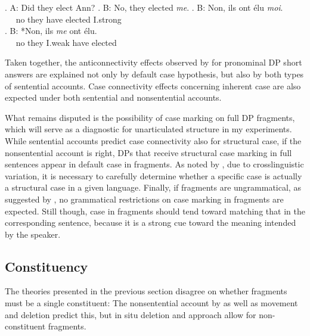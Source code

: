 \ex. A: Did they elect Ann?
\a. B: No, they elected \textit{me}.
\bg.  B: Non, ils ont élu \textit{moi}.\\
~~ no they have elected I.strong\\
\cg. B: *Non, ils \textit{me} ont élu.\\ 
~~ no they I.weak have elected\\

\begin{sloppypar}\noindent
Taken together, the anticonnectivity effects observed by \citet{barton.progovac2005} for pronominal DP short answers are explained not only by  default case hypothesis, but also by both types of sentential accounts. Case connectivity effects concerning inherent case are also expected under both sentential and nonsentential accounts.\end{sloppypar}

What remains disputed is the possibility of case marking on full DP fragments, which will serve as a diagnostic for unarticulated structure in my experiments. While sentential accounts predict case connectivity also for structural case, if the nonsentential account is right, DPs that receive structural case marking in full sentences appear in default case in fragments. As noted by \citet{progovac.etal2006}, due to crosslinguistic variation, it is necessary to carefully determine whether a specific case is actually a structural case in a given language. Finally, if fragments are ungrammatical, as suggested by \citet{bergen.goodman2015}, no grammatical restrictions on case marking in fragments are expected. Still though, case in fragments should tend toward matching that in the corresponding sentence, because it is a strong cue toward the meaning intended by the speaker.

\subsection{Constituency}\label{sec:theories-predictions-constituents}
The theories presented in the previous section disagree on whether fragments must be a single constituent: The nonsentential account by \citet{barton.progovac2005} as well as movement and deletion predict this, but in situ deletion and  approach allow for non-constituent fragments. 

